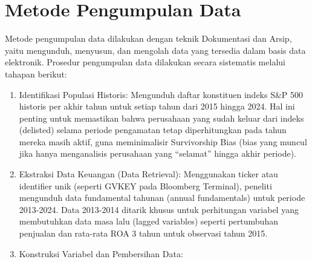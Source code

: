 \documentclass[12pt,a4paper]{report}
\begin{document}
\hypertarget{metode-pengumpulan-data}{%
\section{Metode Pengumpulan Data}\label{metode-pengumpulan-data}}

Metode pengumpulan data dilakukan dengan teknik Dokumentasi dan Arsip,
yaitu mengunduh, menyusun, dan mengolah data yang tersedia dalam basis
data elektronik. Prosedur pengumpulan data dilakukan secara sistematis
melalui tahapan berikut:

\begin{enumerate}
\def\labelenumi{\arabic{enumi}.}
\item
  Identifikasi Populasi Historis: Mengunduh daftar konstituen indeks
  S\&P 500 historis per akhir tahun untuk setiap tahun dari 2015 hingga
  2024. Hal ini penting untuk memastikan bahwa perusahaan yang sudah
  keluar dari indeks (delisted) selama periode pengamatan tetap
  diperhitungkan pada tahun mereka masih aktif, guna meminimalisir
  Survivorship Bias (bias yang muncul jika hanya menganalisis perusahaan
  yang ``selamat'' hingga akhir periode).
\item
  Ekstraksi Data Keuangan (Data Retrieval): Menggunakan ticker atau
  identifier unik (seperti GVKEY pada Bloomberg Terminal), peneliti
  mengunduh data fundamental tahunan (annual fundamentals) untuk periode
  2013-2024. Data 2013-2014 ditarik khusus untuk perhitungan variabel
  yang membutuhkan data masa lalu (lagged variables) seperti pertumbuhan
  penjualan dan rata-rata ROA 3 tahun untuk observasi tahun 2015.
\item
  Konstruksi Variabel dan Pembersihan Data:


\end{enumerate}
\end{document}
